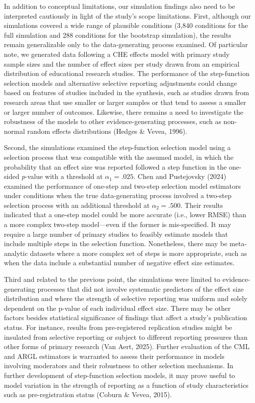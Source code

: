 \documentclass[
  american,
  man, donotrepeattitle,floatsintext]{apa7}
\begin{document}
In addition to conceptual limitations, our simulation findings also need to be interpreted cautiously in light of the study's scope limitations.
First, although our simulations covered a wide range of plausible conditions (3,840 conditions for the full simulation and 288 conditions for the bootstrap simulation), the results remain generalizable only to the data-generating process examined.
Of particular note, we generated data following a CHE effects model with primary study sample sizes and the number of effect sizes per study drawn from an empirical distribution of educational research studies.
The performance of the step-function selection models and alternative selective reporting adjustments could change based on features of studies included in the synthesis, such as studies drawn from research areas that use smaller or larger samples or that tend to assess a smaller or larger number of outcomes.
Likewise, there remains a need to investigate the robustness of the models to other evidence-generating processes, such as non-normal random effects distributions (Hedges \& Vevea, 1996).

Second, the simulations examined the step-function selection model using a selection process that was compatible with the assumed model, in which the probability that an effect size was reported followed a step function in the one-sided \emph{p}-value with a threshold at \(\alpha_1 = .025\).
Chen and Pustejovsky (2024) examined the performance of one-step and two-step selection model estimators under conditions when the true data-generating process involved a two-step selection process with an additional threshold at \(\alpha_2 = .500\).
Their results indicated that a one-step model could be more accurate (i.e., lower RMSE) than a more complex two-step model---even if the former is mis-specified.
It may require a large number of primary studies to feasibly estimate models that include multiple steps in the selection function.
Nonetheless, there may be meta-analytic datasets where a more complex set of steps is more appropriate, such as when the data include a substantial number of negative effect size estimates.

Third and related to the previous point, the simulations were limited to evidence-generating processes that did not involve systematic predictors of the effect size distribution and where the strength of selective reporting was uniform and solely dependent on the p-value of each individual effect size.
There may be other factors besides statistical significance of findings that affect a study's publication status.
For instance, results from pre-registered replication studies might be insulated from selective reporting or subject to different reporting pressures than other forms of primary research (Van Aert, 2025).
Further evaluation of the CML and ARGL estimators is warranted to assess their performance in models involving moderators and their robustness to other selection mechanisms.
In further development of step-function selection models, it may prove useful to model variation in the strength of reporting as a function of study characteristics such as pre-registration status (Coburn \& Vevea, 2015).
\end{document}
